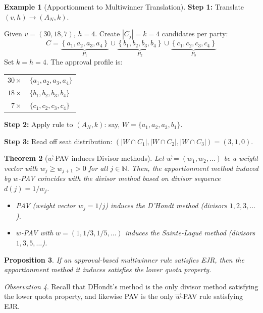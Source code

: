 \documentclass{book}
\theoremstyle{plain}
\newtheorem{theorem}{Theorem}[subsection]
\newtheorem{proposition}[theorem]{Proposition}
\theoremstyle{definition}
\newtheorem{example}[theorem]{Example}
\theoremstyle{remark}
\newtheorem{observation}[theorem]{Observation}
\newcommand{\set}[1]{\left\{#1\right\}}
\begin{document}
\begin{example}[Apportionment to Multiwinner Translation]
    \textbf{Step 1:} Translate $(v, h) \longrightarrow (A_N, k)$.

    Given $v = (30, 18, 7)$, $h = 4$. 
    Create $|C_j| = k = 4$ candidates per party:
    \[
        C = \underbrace{\set{a_1, a_2, a_3, a_4}}_{P_1} 
        \cup \underbrace{\set{b_1, b_2, b_3, b_4}}_{P_2} 
        \cup \underbrace{\set{c_1, c_2, c_3, c_4}}_{P_3}
    \]
    Set $k = h = 4$. The approval profile is:
    \begin{center}
    \begin{tabular}{r l}
        $30 \times$ & $\{a_1, a_2, a_3, a_4\}$ \\
        $18 \times$ & $\{b_1, b_2, b_3, b_4\}$ \\
        $7 \times$  & $\{c_1, c_2, c_3, c_4\}$
    \end{tabular}
    \end{center}

    \textbf{Step 2:} Apply rule to $(A_N, k)$:
    say, 
    $W = \{a_1, a_2, a_3, b_1\}$.

    \textbf{Step 3:} Read off seat distribution: 
    $(|W \cap C_1|, |W \cap C_2|, |W \cap C_3|) = (3, 1, 0)$.
\end{example}

\begin{theorem}[$\vec{w}$-PAV induces Divisor methods]
    Let $\vec{w} = (w_1, w_2, \dots)$ be a weight vector with 
    $w_j \geq w_{j+1} > 0$ for all $j \in \mathbb{N}$.
    Then, the apportionment method induced by $w$-PAV coincides with the 
    divisor method based on divisor sequence $d(j) = 1/w_j$.

    \begin{itemize}
        \item PAV (weight vector $w_j = 1/j$) induces the 
        D'Hondt method (divisors $1, 2, 3, \dots$).
        \item $w$-PAV with $w = (1, 1/3, 1/5, \dots)$ induces the 
        Sainte-Lagu\"e method (divisors $1, 3, 5, \dots$).
    \end{itemize}
\end{theorem}

\begin{proposition}
    If an approval-based multiwinner rule satisfies EJR,
    then the apportionment method it induces satisfies the lower quota property.
\end{proposition}

\begin{observation}
    Recall that DHondt's method is the 
    only divisor method satisfying 
    the lower quota property,
    and likewise 
    PAV is the only $\vec{w}$-PAV rule satisfying EJR.
\end{observation}



\end{document}
